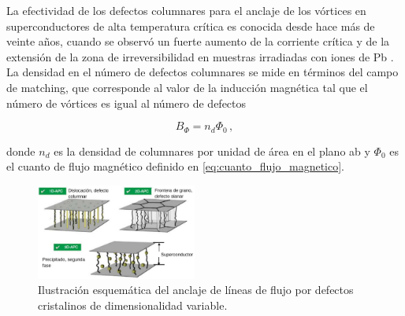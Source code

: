 \documentclass[a4paper,conference]{IEEEtran}
\begin{document}
La efectividad de los defectos columnares para el anclaje de los v\'{o}rtices en
superconductores de alta temperatura cr\'{i}tica es conocida desde hace m\'{a}s
de veinte a\~{n}os, cuando se observ\'{o} un fuerte aumento de la corriente
cr\'{i}tica y de la extensi\'{o}n de la zona de irreversibilidad en muestras
irradiadas con iones de Pb \cite{Marwick1991, Konczykowski1991}.  La densidad en
el n\'{u}mero de defectos columnares se mide en t\'{e}rminos del campo de
matching, que corresponde al valor de la inducci\'{o}n magn\'{e}tica tal que el
n\'{u}mero de v\'{o}rtices es igual al n\'{u}mero de defectos 

\begin{equation}
				\label{eq:matching_field}
				B_\Phi = n_d \Phi_0\,,
\end{equation}

\noindent donde $n_d$ es la densidad de columnares por unidad de \'{a}rea en el
plano ab y $\Phi_0$ es el cuanto de flujo magn\'{e}tico definido en
\ref{eq:cuanto_flujo_magnetico}.

\begin{figure}[!ht]
				\centering 
				\includegraphics[width=0.47\textwidth]{tipos_defectos_1D_2D_3D} 
				\caption{Ilustraci\'{o}n esquem\'{a}tica del anclaje de l\'{i}neas de flujo por
				defectos cristalinos de dimensionalidad variable.
				} 
				\label{fig:tipos_defectos}
\end{figure}

\end{document}
